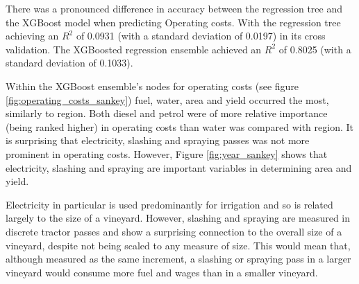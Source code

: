 \documentclass[review,12pt,authoryear]{elsarticle}
\begin{document}
\begin{linenumbers}
There was a pronounced difference in accuracy between the regression tree and the XGBoost model when predicting Operating costs. With the regression tree achieving an $R^2$ of 0.0931 (with a standard deviation of 0.0197) in its cross validation. The XGBoosted regression ensemble achieved an $R^2$ of 0.8025 (with a standard deviation of 0.1033).
\par
Within the XGBoost ensemble's nodes for operating costs (see figure \ref{fig:operating_costs_sankey}) fuel, water, area and yield occurred the most, similarly to region. Both diesel and petrol were of more relative importance (being ranked higher) in operating costs than water was compared with region. It is surprising that electricity, slashing and spraying passes was not more prominent in operating costs. 
However, Figure \ref{fig:year_sankey} shows that electricity, slashing and spraying are important variables in determining area and yield.

Electricity in particular is used predominantly for irrigation and so is related largely to the size of a vineyard. However, slashing and spraying are measured in discrete tractor passes and show a surprising connection to the overall size of a vineyard, despite not being scaled to any measure of size. This would mean that, although measured as the same increment, a slashing or spraying pass in a larger vineyard would consume more fuel and wages than in a smaller vineyard. %

%
%


\end{linenumbers}
\end{document}
